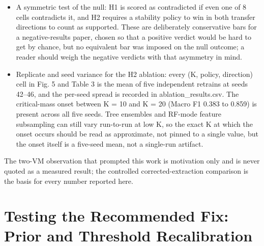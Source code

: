 \documentclass[conference]{IEEEtran}
\begin{document}
\begin{itemize}[leftmargin=*,itemsep=2pt,topsep=2pt]
  \item A symmetric test of the null: H1 is scored as contradicted if even one of 8 cells contradicts it, and H2 requires a stability policy to win in both transfer directions to count as supported. These are deliberately conservative bars for a negative-results paper, chosen so that a positive verdict would be hard to get by chance, but no equivalent bar was imposed on the null outcome; a reader should weigh the negative verdicts with that asymmetry in mind.
  \item Replicate and seed variance for the H2 ablation: every (K, policy, direction) cell in Fig. 5 and Table 3 is the mean of five independent retrains at seeds 42--46, and the per-seed spread is recorded in ablation\_\allowbreak{}results.csv. The critical-mass onset between K = 10 and K = 20 (Macro F1 0.383 to 0.859) is present across all five seeds. Tree ensembles and RF-mode feature subsampling can still vary run-to-run at low K, so the exact K at which the onset occurs should be read as approximate, not pinned to a single value, but the onset itself is a five-seed mean, not a single-run artifact.
\end{itemize}

The two-VM observation that prompted this work is motivation only and is never quoted as a measured result; the controlled corrected-extraction comparison is the basis for every number reported here.
\par\medskip

\section{Testing the Recommended Fix: Prior and Threshold Recalibration}
\end{document}
